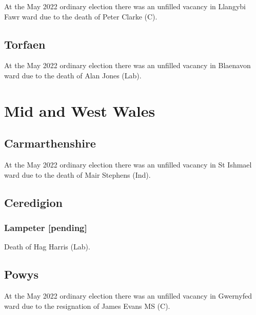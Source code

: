 \documentclass[a4paper,openany]{book}
\begin{document}
\begin{resultsiii}
At the May 2022 ordinary election there was an unfilled vacancy in Llangybi Fawr ward due to the death of Peter Clarke (C).%

\subsection*{Torfaen}

At the May 2022 ordinary election there was an unfilled vacancy in Blaenavon ward due to the death of Alan Jones (Lab).%

\section{Mid and West Wales}

\subsection*{Carmarthenshire}

At the May 2022 ordinary election there was an unfilled vacancy in St Ishmael ward due to the death of Mair Stephens (Ind).%

\subsection*{Ceredigion}

\subsubsection*{Lampeter \hspace*{\fill}\nolinebreak[1]%
	\enspace\hspace*{\fill}
	[pending]}


Death of Hag Harris (Lab).

\subsection*{Powys}

At the May 2022 ordinary election there was an unfilled vacancy in Gwernyfed ward due to the resignation of James Evans MS (C).%


\end{resultsiii}
\end{document}
